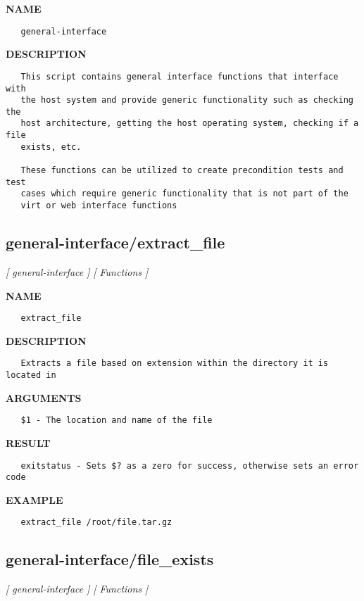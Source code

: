 \label{ch:robo30}
\label{ch:test_suite_general_interface}
\textbf{NAME}
\begin{verbatim}
   general-interface
\end{verbatim}
\textbf{DESCRIPTION}
\begin{verbatim}
   This script contains general interface functions that interface with 
   the host system and provide generic functionality such as checking the
   host architecture, getting the host operating system, checking if a file
   exists, etc.

   These functions can be utilized to create precondition tests and test 
   cases which require generic functionality that is not part of the
   virt or web interface functions
\end{verbatim}
\newpage
\subsection{general-interface/extract\_file}
\textsl{[ general-interface ]}
\textsl{[ Functions ]}

\label{ch:robo19}
\label{ch:general_interface_extract_file}
\textbf{NAME}
\begin{verbatim}
   extract_file
\end{verbatim}
\textbf{DESCRIPTION}
\begin{verbatim}
   Extracts a file based on extension within the directory it is located in
\end{verbatim}
\textbf{ARGUMENTS}
\begin{verbatim}
   $1 - The location and name of the file
\end{verbatim}
\textbf{RESULT}
\begin{verbatim}
   exitstatus - Sets $? as a zero for success, otherwise sets an error code
\end{verbatim}
\textbf{EXAMPLE}
\begin{verbatim}
   extract_file /root/file.tar.gz
\end{verbatim}
\newpage
\subsection{general-interface/file\_exists}
\textsl{[ general-interface ]}
\textsl{[ Functions ]}


